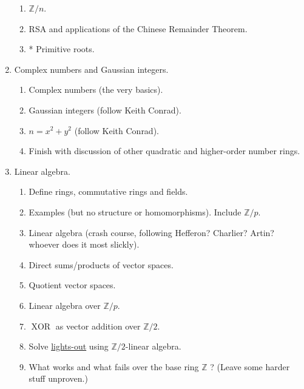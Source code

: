 \documentclass[numbers=enddot,12pt,final,onecolumn,notitlepage]{scrartcl}%
\theoremstyle{definition}
\begin{document}
\begin{enumerate}
\begin{enumerate}
\item $\mathbb{Z}/n$.

\item RSA and applications of the Chinese Remainder Theorem.

\item * Primitive roots.
\end{enumerate}

\item Complex numbers and Gaussian integers.

\begin{enumerate}
\item Complex numbers (the very basics).

\item Gaussian integers (follow Keith Conrad).

\item $n=x^{2}+y^{2}$ (follow Keith Conrad).

\item Finish with discussion of other quadratic and higher-order number rings.
\end{enumerate}

\item Linear algebra.

\begin{enumerate}
\item Define rings, commutative rings and fields.

\item Examples (but no structure or homomorphisms). Include $\mathbb{Z}/p$.

\item Linear algebra (crash course, following Hefferon? Charlier? Artin?
whoever does it most slickly).

\item Direct sums/products of vector spaces.

\item Quotient vector spaces.

\item Linear algebra over $\mathbb{Z}/p$.

\item $\operatorname*{XOR}$ as vector addition over $\mathbb{Z}/2$.

\item Solve \href{https://en.wikipedia.org/wiki/Lights_Out_(game)}{lights-out}
using $\mathbb{Z}/2$-linear algebra.

\item What works and what fails over the base ring $\mathbb{Z}$ ? (Leave some
harder stuff unproven.)


\end{enumerate}
\end{enumerate}
\end{document}
